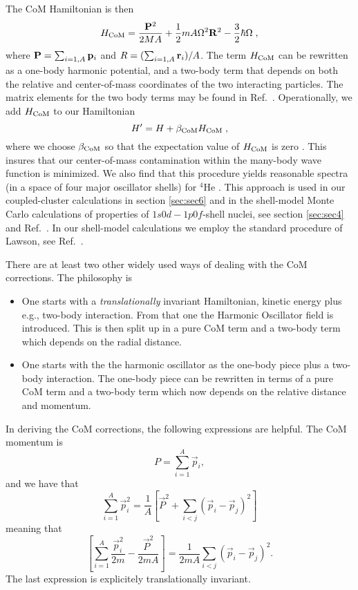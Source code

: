 \documentclass[twoside,12pt]{article}
\begin{document}
The CoM Hamiltonian is then
\begin{equation}
H_{\rm CoM} = \frac{{\bf P}^2}{2MA} 
+\frac{1}{2}mA\Omega^2{\bf R}^2 - \frac{3}{2}\hbar\Omega \;,
\end{equation}
where ${\bf P}=\sum_{i=1,A}{\bf p}_i$ and $R=(\sum_{i=1,A}{\bf r}_i)/A$. 
The term $H_{\rm CoM}$ can be rewritten as a one-body harmonic potential, and a
two-body term that depends on both the relative and center-of-mass 
coordinates of the two interacting particles. The matrix elements for
the two body terms may be found in Ref.~\cite{lawson}. Operationally, 
we add $H_{\rm CoM}$ to our Hamiltonian 
\begin{equation}
H' = H+\beta_{\rm CoM}H_{\rm CoM}\;,
\end{equation}
where we choose $\beta_{\rm CoM}$ so that the expectation value of 
$H_{\rm CoM}$ is zero \cite{drhklz99}. This 
insures that our center-of-mass contamination 
within the many-body wave function is minimized. We also find that this
procedure yields reasonable spectra (in a space of four major
oscillator shells) for ${^4}$He \cite{papenbrock03}. 
This approach is used in our coupled-cluster calculations in section \ref{sec:sec6}
and in the shell-model Monte Carlo calculations of properties of $1s0d-1p0f$-shell
nuclei, see section \ref{sec:sec4} and Ref.~\cite{drhklz99}. In our shell-model
calculations we employ the standard procedure of Lawson, see Ref.~\cite{lawson}.


There are at least two other widely used ways of dealing with the CoM corrections.
The philosophy is
\begin{itemize} 
   \item One starts with a {\em translationally} invariant Hamiltonian,
         kinetic energy plus e.g., two-body interaction.
         From that one the Harmonic Oscillator field is introduced.
         This is then split up in a pure CoM term and a two-body term
         which depends on the radial distance.
   \item One starts with the the harmonic oscillator as the one-body piece
         plus a two-body interaction. The one-body piece can be rewritten 
         in terms of a pure CoM term and a two-body term which now
         depends on the relative distance and momentum. 
\end{itemize}

In deriving the CoM corrections, the following expressions are helpful.
The CoM momentum is
\begin{equation}
   P=\sum_{i=1}^A\vec{p}_i,
\end{equation}
and we have that
\begin{equation}
\sum_{i=1}^A\vec{p}_i^2 =
\frac{1}{A}\left[\vec{P}^2+\sum_{i<j}(\vec{p}_i-\vec{p}_j)^2\right]
\end{equation}
meaning that
\begin{equation}
\left[\sum_{i=1}^A\frac{\vec{p}_i^2}{2m} -\frac{\vec{P}^2}{2mA}\right]
=\frac{1}{2mA}\sum_{i<j}(\vec{p}_i-\vec{p}_j)^2.
\end{equation}
The last expression is explicitely translationally invariant.
\end{document}
